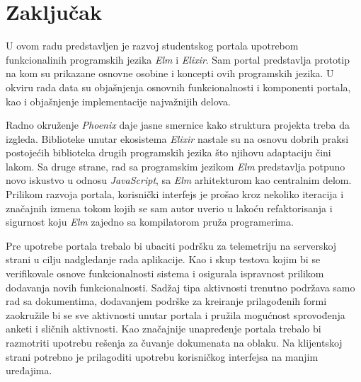 \documentclass[12pt,oneside]{memoir}
\begin{document}
\chapter{Zaključak}
U ovom radu predstavljen je razvoj studentskog portala upotrebom funkcionalinih
programskih jezika \emph{Elm} i \emph{Elixir}. Sam portal predstavlja prototip na
kom su prikazane osnovne osobine i koncepti ovih programskih jezika. U okviru rada
data su objašnjenja osnovnih funkcionalnosti i komponenti portala, kao i
objašnjenje implementacije najvažnijih delova.

Radno okruženje \emph{Phoenix} daje jasne smernice kako struktura projekta treba
da izgleda. Biblioteke unutar ekosistema \emph{Elixir} nastale su na osnovu dobrih
praksi postojećih biblioteka drugih programskih jezika što njihovu adaptaciju
čini lakom. Sa druge strane, rad sa programskim jezikom \emph{Elm} predstavlja
potpuno novo iskustvo u odnosu \emph{JavaScript}, sa \emph{Elm} arhitekturom
kao centralnim delom. Prilikom razvoja portala, korisnički interfejs je prošao
kroz nekoliko iteracija i značajnih izmena tokom kojih se sam autor uverio u lakoću
refaktorisanja i sigurnost koju \emph{Elm} zajedno sa kompilatorom pruža programerima.

Pre upotrebe portala trebalo bi ubaciti podršku za telemetriju na serverskoj strani
u cilju nadgledanje rada aplikacije. Kao i skup testova kojim bi se verifikovale osnove
funkcionalnosti sistema i osigurala ispravnost prilikom dodavanja novih funkcionalnosti.
Sadžaj tipa aktivnosti trenutno podržava samo rad sa dokumentima, dodavanjem podrške za
kreiranje prilagođenih formi zaokružile bi se sve aktivnosti unutar portala i pružila
mogućnost sprovođenja anketi i sličnih aktivnosti.
Kao značajnije unapređenje portala trebalo bi razmotriti
upotrebu rešenja za čuvanje dokumenata na oblaku. Na klijentskoj strani potrebno je
prilagoditi upotrebu korisničkog interfejsa na manjim uređajima.

\literatura


\backmatter
\end{document}
